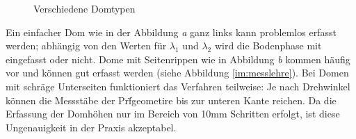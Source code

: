 \begin{figure}[ht]
    \centering 
\caption{Verschiedene Domtypen} 
\label{im:domes}
\end{figure} 

Ein einfacher Dom wie in der Abbildung \textit{a} ganz links kann problemlos erfasst werden; abh\"angig von den Werten f\"ur $\lambda_{1}$ und $\lambda_{2}$ wird die Bodenphase mit eingefasst oder nicht. Dome mit Seitenrippen wie in Abbildung \textit{b} kommen h\"aufig vor und k\"onnen gut erfasst werden (siehe Abbildung \ref{im:messlehre}). Bei Domen mit schr\"age Unterseiten funktioniert das Verfahren teilweise: Je nach Drehwinkel k\"onnen die Messst\"abe der Pr\"fgeometire bis zur unteren Kante reichen. Da die Erfassung der Domh\"ohen nur im Bereich von 10mm Schritten erfolgt, ist diese Ungenauigkeit in der Praxis akzeptabel. 

